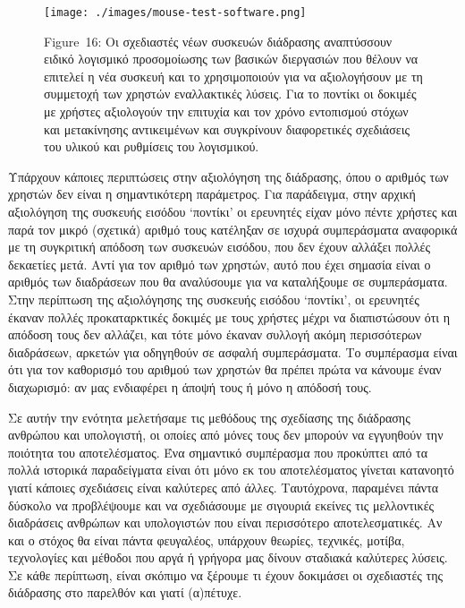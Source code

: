 \documentclass[
]{article}
\begin{document}
\leavevmode{}%
\begin{figure}
\hypertarget{fig:mouse-test-software}{%
\centering
\texttt{[image: ./images/mouse-test-software.png]}
\caption{Figure~16: Οι σχεδιαστές νέων συσκευών διάδρασης αναπτύσσουν
ειδικό λογισμικό προσομοίωσης των βασικών διεργασιών που θέλουν να
επιτελεί η νέα συσκευή και το χρησιμοποιούν για να αξιολογήσουν με τη
συμμετοχή των χρηστών εναλλακτικές λύσεις. Για το ποντίκι οι δοκιμές με
χρήστες αξιολογούν την επιτυχία και τον χρόνο εντοπισμού στόχων και
μετακίνησης αντικειμένων και συγκρίνουν διαφορετικές σχεδιάσεις του
υλικού και ρυθμίσεις του λογισμικού.}\label{fig:mouse-test-software}
}
\end{figure}

Υπάρχουν κάποιες περιπτώσεις στην αξιολόγηση της διάδρασης, όπου ο
αριθμός των χρηστών δεν είναι η σημαντικότερη παράμετρος. Για
παράδειγμα, στην αρχική αξιολόγηση της συσκευής εισόδου `ποντίκι' οι
ερευνητές είχαν μόνο πέντε χρήστες και παρά τον μικρό (σχετικά) αριθμό
τους κατέληξαν σε ισχυρά συμπεράσματα αναφορικά με τη συγκριτική απόδοση
των συσκευών εισόδου, που δεν έχουν αλλάξει πολλές δεκαετίες μετά. Αντί
για τον αριθμό των χρηστών, αυτό που έχει σημασία είναι ο αριθμός των
διαδράσεων που θα αναλύσουμε για να καταλήξουμε σε συμπεράσματα. Στην
περίπτωση της αξιολόγησης της συσκευής εισόδου `ποντίκι', οι ερευνητές
έκαναν πολλές προκαταρκτικές δοκιμές με τους χρήστες μέχρι να
διαπιστώσουν ότι η απόδοση τους δεν αλλάζει, και τότε μόνο έκαναν
συλλογή ακόμη περισσότερων διαδράσεων, αρκετών για οδηγηθούν σε ασφαλή
συμπεράσματα. Το συμπέρασμα είναι ότι για τον καθορισμό του αριθμού των
χρηστών θα πρέπει πρώτα να κάνουμε έναν διαχωρισμό: αν μας ενδιαφέρει η
άποψή τους ή μόνο η απόδοσή τους.

Σε αυτήν την ενότητα μελετήσαμε τις μεθόδους της σχεδίασης της διάδρασης
ανθρώπου και υπολογιστή, οι οποίες από μόνες τους δεν μπορούν να
εγγυηθούν την ποιότητα του αποτελέσματος. Ένα σημαντικό συμπέρασμα που
προκύπτει από τα πολλά ιστορικά παραδείγματα είναι ότι μόνο εκ του
αποτελέσματος γίνεται κατανοητό γιατί κάποιες σχεδιάσεις είναι καλύτερες
από άλλες. Ταυτόχρονα, παραμένει πάντα δύσκολο να προβλέψουμε και να
σχεδιάσουμε με σιγουριά εκείνες τις μελλοντικές διαδράσεις ανθρώπων και
υπολογιστών που είναι περισσότερο αποτελεσματικές. Αν και ο στόχος θα
είναι πάντα φευγαλέος, υπάρχουν θεωρίες, τεχνικές, μοτίβα, τεχνολογίες
και μέθοδοι που αργά ή γρήγορα μας δίνουν σταδιακά καλύτερες λύσεις. Σε
κάθε περίπτωση, είναι σκόπιμο να ξέρουμε τι έχουν δοκιμάσει οι
σχεδιαστές της διάδρασης στο παρελθόν και γιατί (α)πέτυχε.
\end{document}
